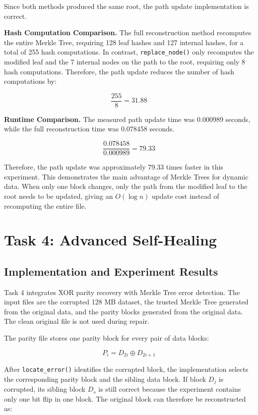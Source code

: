 \documentclass[11pt,a4paper]{article}
\begin{document}
Since both methods produced the same root, the path update implementation is
correct.

\textbf{Hash Computation Comparison.}
The full reconstruction method recomputes the entire Merkle Tree, requiring 128
leaf hashes and 127 internal hashes, for a total of 255 hash computations. In
contrast, \texttt{replace\_node()} only recomputes the modified leaf and the 7
internal nodes on the path to the root, requiring only 8 hash computations.
Therefore, the path update reduces the number of hash computations by:

\[
\frac{255}{8} = 31.88
\]

\textbf{Runtime Comparison.}
The measured path update time was 0.000989 seconds, while the full
reconstruction time was 0.078458 seconds.

\[
\frac{0.078458}{0.000989} = 79.33
\]

Therefore, the path update was approximately 79.33 times faster in this
experiment. This demonstrates the main advantage of Merkle Trees for dynamic
data. When only one block changes, only the path from the modified leaf to the
root needs to be updated, giving an $O(\log n)$ update cost instead of
recomputing the entire file.

\section{Task 4: Advanced Self-Healing}

\subsection{Implementation and Experiment Results}

Task 4 integrates XOR parity recovery with Merkle Tree error detection. The
input files are the corrupted 128 MB dataset, the trusted Merkle Tree generated
from the original data, and the parity blocks generated from the original data.
The clean original file is not used during repair.

The parity file stores one parity block for every pair of data blocks:

\[
P_i = D_{2i} \oplus D_{2i+1}
\]

After \texttt{locate\_error()} identifies the corrupted block, the implementation
selects the corresponding parity block and the sibling data block. If block
$D_j$ is corrupted, its sibling block $D_s$ is still correct because the
experiment contains only one bit flip in one block. The original block can
therefore be reconstructed as:
\end{document}
